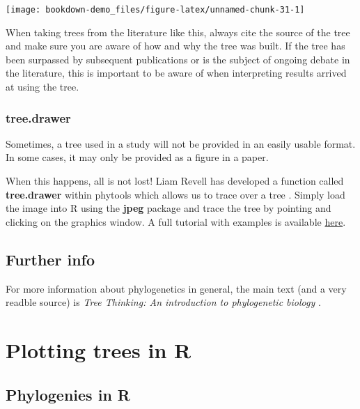 \documentclass[
]{book}
\begin{document}
\begin{center}\texttt{[image: bookdown-demo\_files/figure-latex/unnamed-chunk-31-1]} \end{center}

When taking trees from the literature like this, always cite the source of the tree and make sure you are aware of how and why the tree was built. If the tree has been surpassed by subsequent publications or is the subject of ongoing debate in the literature, this is important to be aware of when interpreting results arrived at using the tree.

\hypertarget{tree.drawer}{%
\subsection{tree.drawer}\label{tree.drawer}}

Sometimes, a tree used in a study will not be provided in an easily usable format. In some cases, it may only be provided as a figure in a paper.

When this happens, all is not lost! Liam Revell has developed a function called \textbf{tree.drawer} within phytools which allows us to trace over a tree \citep{phytools}. Simply load the image into R using the \textbf{jpeg} package \citep{jpeg} and trace the tree by pointing and clicking on the graphics window. A full tutorial with examples is available \href{http://blog.phytools.org/2017/01/second-video-demo-of-treedrawer-in.html}{here}.

\hypertarget{further-info}{%
\section{Further info}\label{further-info}}

For more information about phylogenetics in general, the main text (and a very readble source) is \emph{Tree Thinking: An introduction to phylogenetic biology} \citep{baum12}.

\hypertarget{w1plotting}{%
\chapter{Plotting trees in R}\label{w1plotting}}

\hypertarget{phylogenies-in-r}{%
\section{Phylogenies in R}\label{phylogenies-in-r}}
\end{document}
